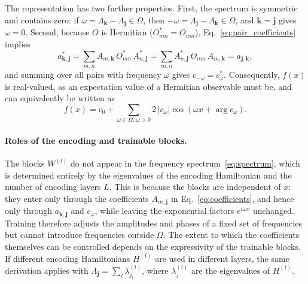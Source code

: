 \documentclass[12pt]{article}
\numberwithin{equation}{section}  %
\begin{document}
The representation has two further properties. First, the spectrum is symmetric and contains zero: if $\omega = \Lambda_{\mathbf{k}} - \Lambda_{\mathbf{j}} \in \Omega$, then $-\omega = \Lambda_{\mathbf{j}} - \Lambda_{\mathbf{k}} \in \Omega$, and $\mathbf{k} = \mathbf{j}$ gives $\omega = 0$. Second, because $O$ is Hermitian ($O_{mn}^* = O_{nm}$), Eq.~\eqref{eq:pair_coefficients} implies
\begin{equation}
a_{\mathbf{k},\mathbf{j}}^* = \sum_{m,n} A_{m,\mathbf{k}}\, O_{mn}^*\, A_{n,\mathbf{j}}^* = \sum_{m,n} A_{n,\mathbf{j}}^*\, O_{nm}\, A_{m,\mathbf{k}} = a_{\mathbf{j},\mathbf{k}},
\end{equation}
and summing over all pairs with frequency $\omega$ gives $c_{-\omega} = c_\omega^*$. Consequently, $f(x)$ is real-valued, as an expectation value of a Hermitian observable must be, and can equivalently be written as
\begin{equation}
f(x) = c_0 + \sum_{\omega \in \Omega,\, \omega > 0} 2\,|c_\omega| \cos\!\left(\omega x + \arg c_\omega\right).
\end{equation}

\paragraph{Roles of the encoding and trainable blocks.} The blocks $W^{(l)}$ do not appear in the frequency spectrum~\eqref{eq:spectrum}, which is determined entirely by the eigenvalues of the encoding Hamiltonian and the number of encoding layers $L$. This is because the blocks are independent of $x$: they enter only through the coefficients $A_{m,\mathbf{j}}$ in Eq.~\eqref{eq:coefficients}, and hence only through $a_{\mathbf{k},\mathbf{j}}$ and $c_\omega$, while leaving the exponential factors $e^{i\omega x}$ unchanged. Training therefore adjusts the amplitudes and phases of a fixed set of frequencies but cannot introduce frequencies outside $\Omega$. The extent to which the coefficients themselves can be controlled depends on the expressivity of the trainable blocks. If different encoding Hamiltonians $H^{(l)}$ are used in different layers, the same derivation applies with $\Lambda_{\mathbf{j}} = \sum_{l} \lambda^{(l)}_{j_l}$, where $\lambda^{(l)}_{j}$ are the eigenvalues of $H^{(l)}$.
\end{document}
